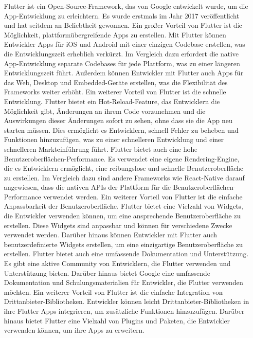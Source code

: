 Flutter ist ein Open-Source-Framework, das von Google entwickelt wurde, um die App-Entwicklung zu erleichtern. 
Es wurde erstmals im Jahr 2017 veröffentlicht und hat seitdem an Beliebtheit gewonnen. 
Ein großer Vorteil von Flutter ist die Möglichkeit, plattformübergreifende Apps zu erstellen. 
Mit Flutter können Entwickler Apps für iOS und Android mit einer einzigen Codebase erstellen, was die Entwicklungszeit erheblich verkürzt. 
Im Vergleich dazu erfordert die native App-Entwicklung separate Codebases für jede Plattform, was zu einer längeren Entwicklungszeit führt. 
Außerdem können Entwickler mit Flutter auch Apps für das Web, Desktop und Embedded-Geräte erstellen, was die Flexibilität des Frameworks weiter erhöht. 
Ein weiterer Vorteil von Flutter ist die schnelle Entwicklung. Flutter bietet ein Hot-Reload-Feature, das Entwicklern die Möglichkeit gibt, Änderungen an ihrem Code vorzunehmen und die Auswirkungen dieser Änderungen sofort zu sehen, ohne dass sie die App neu starten müssen. 
Dies ermöglicht es Entwicklern, schnell Fehler zu beheben und Funktionen hinzuzufügen, was zu einer schnelleren Entwicklung und einer schnelleren Markteinführung führt. 
Flutter bietet auch eine hohe Benutzeroberflächen-Performance. 
Es verwendet eine eigene Rendering-Engine, die es Entwicklern ermöglicht, eine reibungslose und schnelle Benutzeroberfläche zu erstellen. 
Im Vergleich dazu sind andere Frameworks wie React-Native darauf angewiesen, dass die nativen APIs der Plattform für die Benutzeroberflächen-Performance verwendet werden. 
Ein weiterer Vorteil von Flutter ist die einfache Anpassbarkeit der Benutzeroberfläche. 
Flutter bietet eine Vielzahl von Widgets, die Entwickler verwenden können, um eine ansprechende Benutzeroberfläche zu erstellen. 
Diese Widgets sind anpassbar und können für verschiedene Zwecke verwendet werden. 
Darüber hinaus können Entwickler mit Flutter auch benutzerdefinierte Widgets erstellen, um eine einzigartige Benutzeroberfläche zu erstellen. 
Flutter bietet auch eine umfassende Dokumentation und Unterstützung. 
Es gibt eine aktive Community von Entwicklern, die Flutter verwenden und Unterstützung bieten. 
Darüber hinaus bietet Google eine umfassende Dokumentation und Schulungsmaterialien für Entwickler, die Flutter verwenden möchten. 
Ein weiterer Vorteil von Flutter ist die einfache Integration von Drittanbieter-Bibliotheken. 
Entwickler können leicht Drittanbieter-Bibliotheken in ihre Flutter-Apps integrieren, um zusätzliche Funktionen hinzuzufügen. 
Darüber hinaus bietet Flutter eine Vielzahl von Plugins und Paketen, die Entwickler verwenden können, um ihre Apps zu erweitern.
